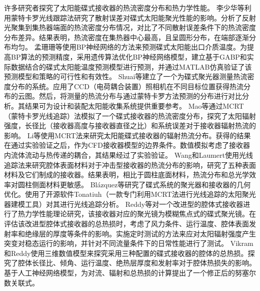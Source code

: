 许多研究者探究了太阳能碟式接收器的热流密度分布和热力学性能。
李少华等\cite{Li2017}利用蒙特卡罗光线跟踪法研究了散射误差对碟式太阳能聚光性能的影响。分析了反射光聚集到集热器端面的热流密度分布情况，对比了不同散射误差条件下的热流密度分布差异。结果表明，热流密度在集热器中心最高，且呈圆形分布，在端部逐渐分布均匀。
孟珊珊等\cite{Meng2016}使用BP神经网络的方法来预测碟式太阳能出口介质温度。为提高BP算法的预测精度，采用遗传算法优化BP神经网络模型，建立基于GABP和实际数据结合的碟式太阳能温度预测模型进行预测，并通过MATLAB仿真验证了该预测模型和策略的可行性和有效性。
Shuai等\cite{Shuai2010}建立了一个为碟式聚光器测量热流密度分布的系统。应用了CCD（电荷耦合装置）照相机在不同目标位置获得热流分布的云图。然后，将测量的热流分布与通过蒙特卡罗方法预测的分布进行对比分析。其结果可为设计和装配太阳能收集系统提供重要参考。
Mao等\cite{Mao2014b}通过MCRT（蒙特卡罗光线追踪）法模拟了一个碟式接收器的热流密度分布，探究了太阳辐射强度，长径比（接收器高度与接收器直径之比）和系统误差对于接收器辐射热流的影响。
Li等\cite{Li2011b}使用MCRT法来研究太阳能碟式接收器的辐射热流分布。获得的结果在通过实验验证之后，作为CFD接收器模型的边界条件。数值模拟考虑了接收器内流体流动与热传递的耦合，其结果经过了实验验证。
Wang和Laumert\cite{Wang2017}使用光线追踪法来研究腔体表面材料对于冲击型接收器的热流分布的影响，研究了五种表面材料及它们制成的接收器。结果表明，相比于圆柱底面材料，热流分布和总光学效率对圆柱侧面材料更敏感。
Bl\'{a}zquez等\cite{Blazquez2016}研究了碟式系统的聚光器和接收器的几何优化。使用了开源软件Tonatiuh（一款专门利用MCRT法进行光线追踪的太阳聚光器建模工具）对其进行光线追踪分析。
Reddy等\cite{Reddy2015,Reddy2015b}对一个改进型的腔体式接收器进行了热力学性能理论研究，该接收器对应的聚光镜为模糊焦点式的碟式聚光镜。在评估该改进型腔体式接收器的总热损时，考虑了风力条件、运行温度、腔体表面发射率和绝缘层的厚度等条件的影响。实施定时测试的方法来应对太阳辐射强度产生突变对稳态运行的影响，并针对不同流量条件下的日常性能进行了测试。
Vikram和Reddy\cite{Vikram2015}使用三维数值模型来探究采用三种配置的碟式接收器的腔体的总热损。探究了腔体长径比、倾角、运行温度、绝热层厚度和发射率对于腔体热损失的影响。基于人工神经网络模型，为对流、辐射和总热损的计算提出了一个修正后的努塞尔数关联式。

